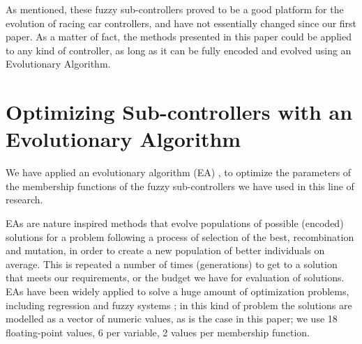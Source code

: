 \documentclass[10pt,journal,compsoc]{IEEEtran}
\begin{document}
As mentioned, these fuzzy sub-controllers proved to be a good platform for the evolution of racing car controllers, and have not essentially changed since our first paper. As a matter of fact, the methods presented in this paper could
be applied to any kind of controller, as long as it can be fully
encoded and evolved using an Evolutionary Algorithm. 

\section{Optimizing Sub-controllers with an Evolutionary Algorithm}
\label{sec:ga}

We have applied an evolutionary algorithm (EA) \cite{EAs_Back96}, to optimize the parameters of the membership functions of the fuzzy sub-controllers we have used in this line of research.

EAs are nature inspired methods that evolve populations of possible (encoded) solutions for a problem following a process of selection of the best,
recombination and mutation, in order to create a new population of
better individuals on average. This is repeated a number of times
(generations) to get to a solution that meets our requirements, or the
budget we have for evaluation of solutions. EAs have been widely
applied to solve a huge amount of optimization problems, including regression and fuzzy systems \cite{hoffmann2001evolutionary}; in this kind of problem the solutions are modelled as a vector of numeric values, as is the
case in this paper; we use 18 floating-point values, 6 per variable, 2 values per membership function.




\end{document}
